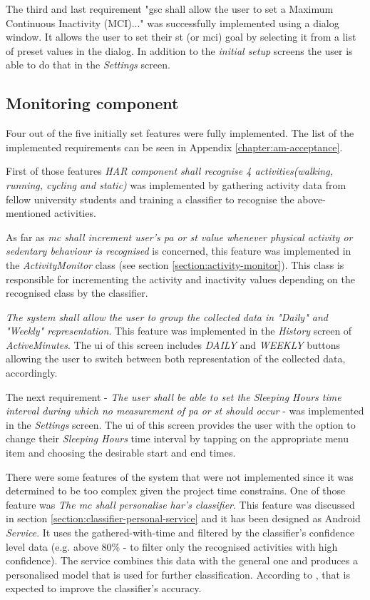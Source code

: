 The third and last requirement "\gls{gsc} shall allow the user to set a Maximum Continuous Inactivity (MCI)..." was successfully implemented using a dialog window. It allows the user to set their \gls{st} (or \gls{mci}) goal by selecting it from a list of preset values in the dialog. In addition to the \textit{initial setup} screens the user is able to do that in the \textit{Settings} screen. 

\subsection{Monitoring component}
Four out of the five initially set features were fully implemented. The list of the implemented requirements can be seen in Appendix \ref{chapter:am-acceptance}.

First of those features \textit{HAR component shall recognise 4 activities(walking, running, cycling and static)} was implemented by gathering activity data from fellow university students and training a classifier to recognise the above-mentioned activities.

As far as \textit{\gls{mc} shall increment user's \gls{pa} or \gls{st} value whenever physical activity or sedentary behaviour is recognised} is concerned, this feature was implemented in the \textit{ActivityMonitor} class (see section \ref{section:activity-monitor}). This class is responsible for incrementing the activity and inactivity values depending on the recognised class by the classifier.

\textit{The system shall allow the user to group the collected data in "Daily" and "Weekly" representation}. This feature was implemented in the \textit{History} screen of \textit{ActiveMinutes}. The \gls{ui} of this screen includes \textit{DAILY} and \textit{WEEKLY} buttons allowing the user to switch between both representation of the collected data, accordingly.

The next requirement - \textit{The user shall be able to set the \textit{Sleeping Hours} time interval during which no measurement of \gls{pa} or \gls{st} should occur} - was implemented in the \textit{Settings} screen. The \gls{ui} of this screen provides the user with the option to change their \textit{Sleeping Hours} time interval by tapping on the appropriate menu item and choosing the desirable start and end times.

There were some features of the system that were not implemented since it was determined to be too complex given the project time constrains. One of those feature was \textit{The \gls{mc} shall personalise \gls{har}'s classifier}. This feature was discussed in section \ref{section:classifier-personal-service} and it has been designed as Android \textit{Service}. It uses the gathered-with-time and filtered by the classifier's confidence level data (e.g. above 80\% - to filter only the recognised activities with high confidence). The service combines this data with the general one and produces a personalised model that is used for further classification. According to \citet[376]{arapakis_athanasakos_jose_2010}, that is expected to improve the classifier's accuracy.

